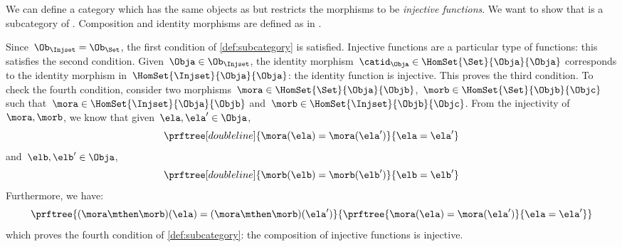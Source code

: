 \begin{example}
    \label{ex:Injset}
    We can define a category \iindex{\Injset} which has the same objects as \Set but restricts the morphisms to be \emph{injective functions}.
    We want to show that \Injset is a subcategory of \Set.
    Composition and identity morphisms are defined as in \Set.
    
    Since~$\Ob_{\Injset}=\Ob_{\Set}$, the first condition of \cref{def:subcategory} is satisfied.
    Injective functions are a particular type of functions: this satisfies the second condition.
    Given~$\Obja\in \Ob_{\Injset}$, the identity morphism~$\catid_\Obja\in \HomSet{\Set}{\Obja}{\Obja}$ corresponds to the identity morphism in~$\HomSet{\Injset}{\Obja}{\Obja}$:
    the identity function is injective.
    This proves the third condition.
    To check the fourth condition, consider two morphisms~$\mora \in \HomSet{\Set}{\Obja}{\Objb}$,~$\morb \in \HomSet{\Set}{\Objb}{\Objc}$ such that~$\mora \in \HomSet{\Injset}{\Obja}{\Objb}$ and~$\morb\in \HomSet{\Injset}{\Objb}{\Objc}$.
    From the injectivity of~$\mora,\morb$, we know that given~$\ela,\ela'\in \Obja$,
    \begin{equation*}
        \prftree[double line]{\mora(\ela)=\mora(\ela')}{\ela=\ela'}
    \end{equation*}
    and~$\elb,\elb'\in \Obja$,
    \begin{equation*}
        \prftree[double line]{\morb(\elb)=\morb(\elb')}{\elb=\elb'}
    \end{equation*}
    Furthermore, we have:
    \begin{equation*}
        \prftree{(\mora \mthen \morb)(\ela)
            =(\mora \mthen \morb)(\ela')}{\prftree{\mora(\ela)=\mora(\ela')}{\ela=\ela'}}
    \end{equation*}
    which proves the fourth condition of \cref{def:subcategory}: the composition of injective functions is injective.
\end{example}


